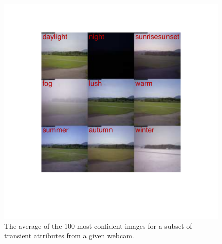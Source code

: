 \documentclass[10pt,twocolumn,letterpaper]{article}
\begin{document}
\begin{figure}[t]
	\centering
		\includegraphics[width=\linewidth]{figs/montage_pruned_cam_7211.pdf}
		\caption{The average of the 100 most confident images for
             a subset of transient attributes from a given webcam.} 
		\label{fig:netvis}
\end{figure}
\end{document}
